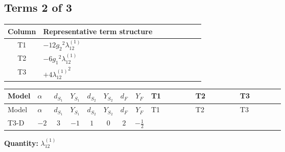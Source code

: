 \documentclass[8pt]{article}
\begin{document}
\begin{landscape}
\subsection*{Terms 2 of 3}
\begin{center}
\begin{tabular}{@{}c >{\raggedright\arraybackslash}p{0.82\linewidth}@{}}
\toprule
Column & Representative term structure \\
\midrule
T1 & \(\displaystyle -12 {g_2}^2 {\lambda_{12}^{(1)}}\) \\
\midrule
T2 & \(\displaystyle -6 {g_1}^2 {\lambda_{12}^{(1)}}\) \\
\midrule
T3 & \(\displaystyle +4 {\lambda_{12}^{(1)}}^2\) \\
\midrule
\bottomrule
\end{tabular}
\end{center}
\smallskip
\tiny
\begin{longtable}{@{}llcccccc >{\raggedright\arraybackslash}p{0.21\linewidth} >{\raggedright\arraybackslash}p{0.21\linewidth} >{\raggedright\arraybackslash}p{0.21\linewidth}@{}}
\toprule
Model & $\alpha$ & $d_{S_1}$ & $Y_{S_1}$ & $d_{S_2}$ & $Y_{S_2}$ & $d_F$ & $Y_F$ & T1 & T2 & T3 \\
\midrule
\endfirsthead
\toprule
Model & $\alpha$ & $d_{S_1}$ & $Y_{S_1}$ & $d_{S_2}$ & $Y_{S_2}$ & $d_F$ & $Y_F$ & T1 & T2 & T3 \\
\midrule
\endhead
T3-D & $-2$ & $3$ & $-1$ & $1$ & $0$ & $2$ & $-\frac{1}{2}$ & \scriptsize\adjustbox{max width=\linewidth}{$\begin{gathered} -12 {g_2}^2 {\lambda_{12}^{(1)}}\end{gathered}$} & \scriptsize\adjustbox{max width=\linewidth}{$\begin{gathered} -6 {g_1}^2 {\lambda_{12}^{(1)}}\end{gathered}$} & \scriptsize\adjustbox{max width=\linewidth}{$\begin{gathered} +4 {\lambda_{12}^{(1)}}^2\end{gathered}$} \\
\midrule
\bottomrule
\end{longtable}
\clearpage
\noindent\textbf{Quantity: }$\lambda_{12}^{(1)}$\par\smallskip

\end{landscape}
\end{document}
